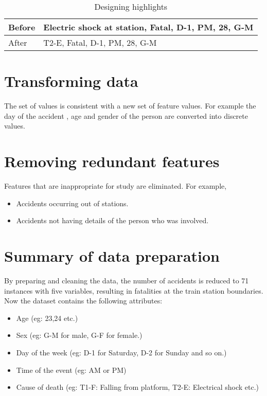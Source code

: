 \begin{table}[h!]
    \centering
    \begin{tabular}{l|l}
         Before &  Electric shock at station, Fatal, D-1, PM, 28, G-M\\
         \hline 
         After & T2-E, Fatal, D-1, PM, 28, G-M
    \end{tabular}
    \caption{Designing highlights}
    \label{tab:highlights}
\end{table}

\section{Transforming data}
The set of values is consistent with a new set of feature values. For example the day of the accident , age and gender of the person are converted into discrete values. 

\section{Removing redundant features}
Features that are inappropriate for study are eliminated. For example,
\begin{itemize}
    \item Accidents occurring out of stations. 
    \item Accidents not having details of the person who was involved. 
\end{itemize}

\section{Summary of data preparation}
By preparing and cleaning the data, the number of accidents is reduced to 71 instances with five variables, resulting in fatalities at the train station boundaries. Now the dataset contains the following attributes: 

\begin{itemize}
    \item Age (eg: 23,24 etc.)
    \item Sex  (eg: G-M for male, G-F for female.)
    \item Day of the week (eg: D-1 for Saturday, D-2 for Sunday and so on.)
    \item Time of the event (eg: AM or PM)
    \item Cause of death (eg: T1-F: Falling from platform, T2-E: Electrical shock etc.)
\end{itemize}
